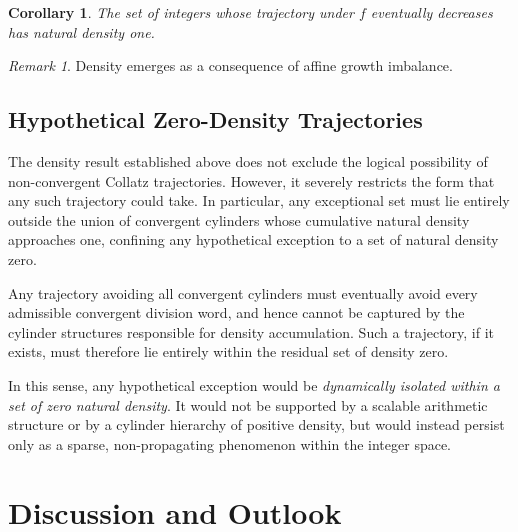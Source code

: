 \documentclass[12pt, oneside]{article}
\numberwithin{equation}{section}
\theoremstyle{definition}
\theoremstyle{plain}
\newtheorem{corollary}[theorem]{Corollary}
\theoremstyle{remark}
\newtheorem*{remark}{Remark}
\begin{document}
\begin{corollary}
The set of integers whose trajectory under $f$ eventually decreases
has natural density one.
\end{corollary}

\begin{remark}
Density emerges as a consequence of affine growth imbalance.
\end{remark}

\subsection{Hypothetical Zero-Density Trajectories}

The density result established above does not exclude the logical possibility of
non-convergent Collatz trajectories. However, it severely restricts the form that
any such trajectory could take. In particular, any exceptional set must lie entirely
outside the union of convergent cylinders whose cumulative natural density
approaches one, confining any hypothetical exception to a set of natural density zero.

Any trajectory avoiding all convergent cylinders must eventually avoid every
admissible convergent division word, and hence cannot be captured by the cylinder
structures responsible for density accumulation. Such a trajectory, if it exists,
must therefore lie entirely within the residual set of density zero.

In this sense, any hypothetical exception would be \emph{dynamically isolated within
a set of zero natural density}.  It would not be supported by a scalable arithmetic
structure or by a cylinder hierarchy of positive density, but would instead persist
only as a sparse, non-propagating phenomenon within the integer space.

\section{Discussion and Outlook}


\end{document}
